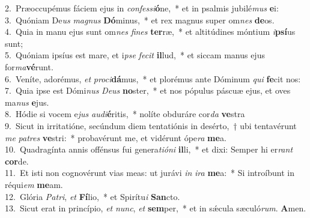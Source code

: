 {2.~}Præoccupémus fáciem ejus in \textit{con}\textit{fes}\textit{si}\textbf{ó}ne,~* et in psalmis jubilé\textit{mus} \textbf{e}i:\\
{3.~}Quóniam De\textit{us} \textit{ma}\textit{gnus} \textbf{Dó}minus,~* et rex magnus super om\textit{nes} \textbf{de}os.\\
{4.~}Quia in manu ejus sunt om\textit{nes} \textit{fi}\textit{nes} \textbf{ter}ræ,~* et altitúdines móntium \textit{i}\textbf{psí}us sunt;\\
{5.~}Quóniam ipsíus est mare, et i\textit{pse} \textit{fe}\textit{cit} \textbf{il}lud,~* et siccam manus ejus for\textit{ma}\textbf{vé}runt.\\
{6.~}Veníte, adorémus, \textit{et} \textit{pro}\textit{ci}\textbf{dá}mus,~* et plorémus ante Dóminum \textit{qui} \textbf{fe}cit nos:\\
{7.~}Quia ipse est Dómi\textit{nus} \textit{De}\textit{us} \textbf{no}ster,~* et nos pópulus páscuæ ejus, et oves ma\textit{nus} \textbf{e}jus.\\
{8.~}Hódie si vocem e\textit{jus} \textit{au}\textit{di}\textbf{é}ritis,~* nolíte obduráre cor\textit{da} \textbf{ve}stra\\
{9.~}Sicut in irritatióne, secúndum diem tentatiónis in desérto,~† ubi tentavérunt \textit{me} \textit{pa}\textit{tres} \textbf{ve}stri:~* probavérunt me, et vidérunt ópe\textit{ra} \textbf{me}a.\\
{10.~}Quadragínta annis offénsus fui genera\textit{ti}\textit{ó}\textit{ni} \textbf{il}li,~* et dixi: Semper hi er\textit{rant} \textbf{cor}de.\\
{11.~}Et isti non cognovérunt vias meas: ut jurávi \textit{in} \textit{i}\textit{ra} \textbf{me}a:~* Si introíbunt in réqui\textit{em} \textbf{me}am.\\
{12.~}Glória \textit{Pa}\textit{tri}, \textit{et} \textbf{Fí}lio,~* et Spirítu\textit{i} \textbf{San}cto.\\
{13.~}Sicut erat in princípio, \textit{et} \textit{nunc}, \textit{et} \textbf{sem}per,~* et in sǽcula sæculó\textit{rum}. \textbf{A}men.\\
